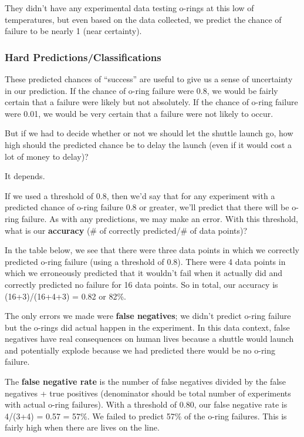\documentclass[]{book}
\begin{document}
They didn't have any experimental data testing o-rings at this low of temperatures, but even based on the data collected, we predict the chance of failure to be nearly 1 (near certainty).

\hypertarget{hard-predictionsclassifications}{%
\subsubsection{Hard Predictions/Classifications}\label{hard-predictionsclassifications}}

These predicted chances of ``success'' are useful to give us a sense of uncertainty in our prediction. If the chance of o-ring failure were 0.8, we would be fairly certain that a failure were likely but not absolutely. If the chance of o-ring failure were 0.01, we would be very certain that a failure were not likely to occur.

But if we had to decide whether or not we should let the shuttle launch go, how high should the predicted chance be to delay the launch (even if it would cost a lot of money to delay)?

It depends.

If we used a threshold of 0.8, then we'd say that for any experiment with a predicted chance of o-ring failure 0.8 or greater, we'll predict that there will be o-ring failure. As with any predictions, we may make an error. With this threshold, what is our \textbf{accuracy} (\# of correctly predicted/\# of data points)?

In the table below, we see that there were three data points in which we correctly predicted o-ring failure (using a threshold of 0.8). There were 4 data points in which we erroneously predicted that it wouldn't fail when it actually did and correctly predicted no failure for 16 data points. So in total, our accuracy is (16+3)/(16+4+3) = 0.82 or 82\%.

The only errors we made were \textbf{false negatives}; we didn't predict o-ring failure but the o-rings did actual happen in the experiment. In this data context, false negatives have real consequences on human lives because a shuttle would launch and potentially explode because we had predicted there would be no o-ring failure.

The \textbf{false negative rate} is the number of false negatives divided by the false negatives + true positives (denominator should be total number of experiments with actual o-ring failures). With a threshold of 0.80, our false negative rate is 4/(3+4) = 0.57 = 57\%. We failed to predict 57\% of the o-ring failures. This is fairly high when there are lives on the line.
\end{document}
